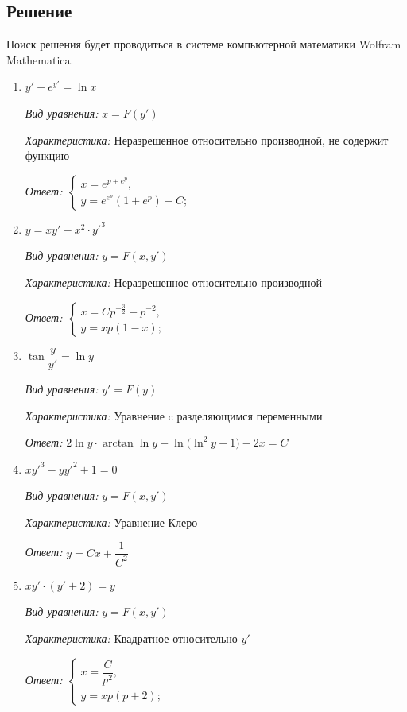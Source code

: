 \documentclass[a4paper, 14pt, fleqn]{extarticle}
\begin{document}
		\subsection{Решение}
			\noindent Поиск решения будет проводиться в системе компьютерной математики Wolfram Mathematica.
			\begin{enumerate}
				\item \(  y' + e^{y'} = \ln{x} \)

					\textit{Вид уравнения:} \( x = F(y') \)

					\textit{Характеристика:} Неразрешенное относительно производной, не содержит функцию
		
					\textit{Ответ:} \(\begin{cases}
									x = e^{p+e^p}, \\
									y = e^{e^p}(1+e^p) + C;
								\end{cases}\) 
				\item \(  y = xy' - x^2 \cdot y'^{3} \)

					\textit{Вид уравнения:} \( y = F(x, y') \)

					\textit{Характеристика:} Неразрешенное относительно производной
		
					\textit{Ответ:} \(\begin{cases}
									x = Cp^{-\frac{3}{2}} - p^{-2}, \\
									y = xp(1-x);
								\end{cases}\) 

				\item \( \tan{\dfrac{y}{y'}} = \ln{y} \)
				
					\textit{Вид уравнения:} \( y' = F(y) \)
 
					\textit{Характеристика:} Уравнение c разделяющимся переменными

					\textit{Ответ:} \( 2\ln{y} \cdot \arctan{\ln{y}} -\ln{\big(\ln^2{y} + 1\big)} - 2x = C \)

				\item \( xy'^3 - yy'^2 + 1 = 0 \)

					\textit{Вид уравнения:} \( y = F(x, y') \)

					\textit{Характеристика:} Уравнение Клеро
		
					\textit{Ответ:} \( y = Cx + \dfrac{1}{C^2} \)

				\item \( xy' \cdot (y' + 2) = y \)

					\textit{Вид уравнения:} \( y = F(x, y') \)

					\textit{Характеристика:} Квадратное относительно \( y' \)
		
					\textit{Ответ:} \(\begin{cases}
									x = \dfrac{C}{p^2}, \\
									y = xp(p+2);
								\end{cases}\) 
			\end{enumerate}
\end{document}
